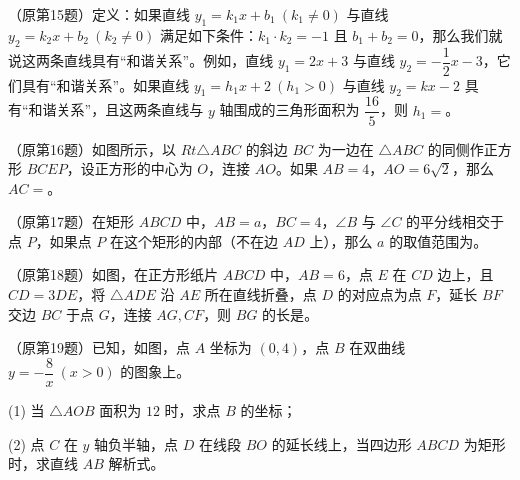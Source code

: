 \documentclass{exam-zh}
\newcommand{\answerarea}[1][40mm]{%
  \vspace{2mm}%
  \begin{tcolorbox}[
    enhanced, breakable,
    colback=white,
    colframe=white,
    boxrule=0pt,
    height=#1,
    valign=top,
    bottom=0mm,
    after skip=0mm,
  ]
  \end{tcolorbox}%
}
\begin{document}
\begin{question}[points=4]
  （原第15题）定义：如果直线 $y_1=k_1x+b_1\ (k_1\ne0)$ 与直线 $y_2=k_2x+b_2\ (k_2\ne0)$ 满足如下条件：$k_1\cdot k_2=-1$ 且 $b_1+b_2=0$，那么我们就说这两条直线具有“和谐关系”。例如，直线 $y_1=2x+3$ 与直线 $y_2=-\dfrac12x-3$，它们具有“和谐关系”。如果直线 $y_1=h_1x+2\ (h_1>0)$ 与直线 $y_2=kx-2$ 具有“和谐关系”，且这两条直线与 $y$ 轴围成的三角形面积为 $\dfrac{16}{5}$，则 $h_1=$\underline{\hspace{28mm}}。
\end{question}



\begin{question}[points=4]
  （原第16题）如图所示，以 $Rt\triangle ABC$ 的斜边 $BC$ 为一边在 $\triangle ABC$ 的同侧作正方形 $BCEP$，设正方形的中心为 $O$，连接 $AO$。如果 $AB=4$，$AO=6\sqrt2$，那么 $AC=$\underline{\hspace{28mm}}。
\end{question}



\begin{question}[points=4]
  （原第17题）在矩形 $ABCD$ 中，$AB=a$，$BC=4$，$\angle B$ 与 $\angle C$ 的平分线相交于点 $P$，如果点 $P$ 在这个矩形的内部（不在边 $AD$ 上），那么 $a$ 的取值范围为\underline{\hspace{28mm}}。
\end{question}



\begin{question}[points=4]
  （原第18题）如图，在正方形纸片 $ABCD$ 中，$AB=6$，点 $E$ 在 $CD$ 边上，且 $CD=3DE$，将 $\triangle ADE$ 沿 $AE$ 所在直线折叠，点 $D$ 的对应点为点 $F$，延长 $BF$ 交边 $BC$ 于点 $G$，连接 $AG,CF$，则 $BG$ 的长是\underline{\hspace{28mm}}。
\end{question}



\begin{problem}[points=8]
  （原第19题）已知，如图，点 $A$ 坐标为 $(0,4)$，点 $B$ 在双曲线 $y=-\dfrac8x\ (x>0)$ 的图象上。\par (1) 当 $\triangle AOB$ 面积为 $12$ 时，求点 $B$ 的坐标；\par (2) 点 $C$ 在 $y$ 轴负半轴，点 $D$ 在线段 $BO$ 的延长线上，当四边形 $ABCD$ 为矩形时，求直线 $AB$ 解析式。
  \answerarea[62mm]
\end{problem}


\end{document}

